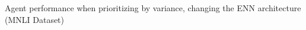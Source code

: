 \documentclass[preview]{standalone}
\begin{document}
\begin{center}
Agent performance when prioritizing by variance, changing the ENN architecture (MNLI Dataset)
\end{center}
\end{document}
